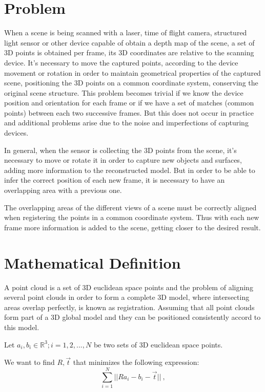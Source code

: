 \section{Problem}

When a scene is being scanned with a laser, time of flight camera, structured 
light sensor or other device capable of obtain a depth map of the scene,
 a set of 3D points is obtained per frame, its 3D coordinates 
are relative to the scanning device. It's necessary to move the captured points, 
according to the device movement or rotation in order to maintain geometrical properties of the captured scene,
 positioning the 3D points on a common coordinate system, conserving 
the original scene structure. This problem becomes trivial if we know the device position and orientation 
for each frame or if we have a set of matches (common points)  between each two successive 
frames. But this does not occur in practice and additional problems arise due 
to the noise and imperfections of capturing devices.


In general, when the sensor is collecting the 3D points from the scene, 
 it's necessary to move or rotate it in order to capture new objects and surfaces,
 adding more information to the reconstructed model. But in order to be 
able to infer the correct position of each new frame, it is necessary to have an overlapping area with a previous one. 
 
The overlapping areas of the different views of a scene must be correctly 
aligned when registering the points in a common coordinate system. 
Thus with each new frame more information is added to the scene, 
getting closer to the desired result. 

\section{Mathematical Definition}

A point cloud is a set of 3D euclidean space points and the problem of aligning several point clouds 
in order to form a complete 3D model, where intersecting areas overlap perfectly, 
is known as registration. Assuming that all point clouds form part of a 3D global model and they can be 
 positioned  consistently accord to this model.

Let  ${a_i},{b_i} \in \mathbb{R}^3;i = 1,2,...,N$ be two sets of 3D euclidean space points.

We want to find $R,\vec{t}$ that minimizes the following expression:
$$
\sum\limits_{i=1}^N || Ra_i - b_i - \vec{t} || \ ,
$$

